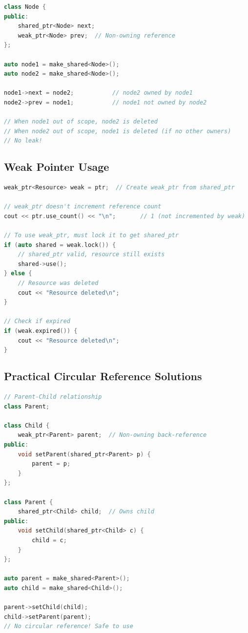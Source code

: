 \begin{lstlisting}[language={C++}]
class Node {
public:
    shared_ptr<Node> next;
    weak_ptr<Node> prev;  // Non-owning reference
};

auto node1 = make_shared<Node>();
auto node2 = make_shared<Node>();

node1->next = node2;           // node2 owned by node1
node2->prev = node1;           // node1 not owned by node2

// When node1 out of scope, node2 is deleted
// When node2 out of scope, node1 is deleted (if no other owners)
// No leak!
\end{lstlisting}

\hypertarget{weak-pointer-usage}{%
\subsection{Weak Pointer Usage}\label{weak-pointer-usage}}

\begin{lstlisting}[language={C++}]
weak_ptr<Resource> weak = ptr;  // Create weak_ptr from shared_ptr

// weak_ptr doesn't increment reference count
cout << ptr.use_count() << "\n";       // 1 (not incremented by weak)

// To use weak_ptr, must lock it to get shared_ptr
if (auto shared = weak.lock()) {
    // shared_ptr valid, resource still exists
    shared->use();
} else {
    // Resource was deleted
    cout << "Resource deleted\n";
}

// Check if expired
if (weak.expired()) {
    cout << "Resource deleted\n";
}
\end{lstlisting}

\hypertarget{practical-circular-reference-solutions}{%
\subsection{Practical Circular Reference
Solutions}\label{practical-circular-reference-solutions}}

\begin{lstlisting}[language={C++}]
// Parent-Child relationship
class Parent;

class Child {
    weak_ptr<Parent> parent;  // Non-owning back-reference
public:
    void setParent(shared_ptr<Parent> p) {
        parent = p;
    }
};

class Parent {
    shared_ptr<Child> child;  // Owns child
public:
    void setChild(shared_ptr<Child> c) {
        child = c;
    }
};

auto parent = make_shared<Parent>();
auto child = make_shared<Child>();

parent->setChild(child);
child->setParent(parent);
// No circular reference! Safe to use
\end{lstlisting}


